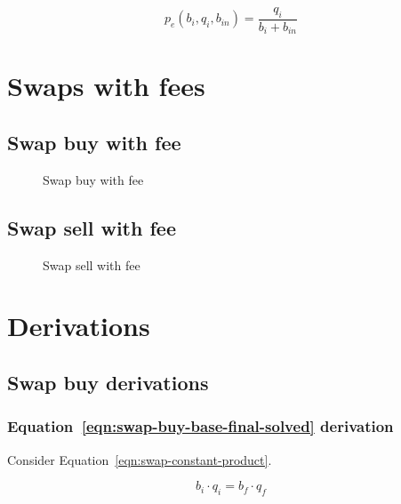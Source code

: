 \documentclass[table, twocolumn]{article}
\begin{document}
\begin{equation}\label{eqn:swap-sell-execution-price-solved}
	p_e (b_i, q_i, b_{in}) = \frac{q_i}{b_i + b_{in}}
\end{equation}

\section{Swaps with fees}\label{sec:swaps-with-fees}

\subsection{Swap buy with fee}\label{ssec:swap-buy-with-fee}

\begin{figure}[!htb]
	\centering
	
	\caption{Swap buy with fee}\label{fig:swap-buy-with-fee}
\end{figure}

\subsection{Swap sell with fee}\label{ssec:swap-sell-with-fee}

\begin{figure}[!htb]
	\centering
	
	\caption{Swap sell with fee}\label{fig:swap-sell-with-fee}
\end{figure}

\section{Derivations}\label{sec:derivations}

\subsection{Swap buy derivations}\label{ssec:swap-buy-derivations}

\subsubsection{Equation~\ref{eqn:swap-buy-base-final-solved} derivation}%
\label{sssec:equation-eqn-swap-buy-base-final-solved-derivation}

Consider Equation~\ref{eqn:swap-constant-product}.

\begin{equation}
	b_i \cdot q_i = b_f \cdot q_f \nonumber
\end{equation}
\end{document}
